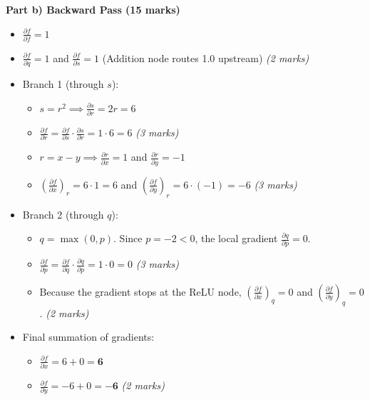 \documentclass[11pt]{article}
\begin{document}
\textbf{Part b) Backward Pass (15 marks)}
\begin{itemize}
    \item $\frac{\partial f}{\partial f} = 1$
    \item $\frac{\partial f}{\partial q} = 1$ and $\frac{\partial f}{\partial s} = 1$ (Addition node routes 1.0 upstream) \textit{(2 marks)}
    \item Branch 1 (through $s$):
        \begin{itemize}
            \item $s = r^2 \implies \frac{\partial s}{\partial r} = 2r = 6$
            \item $\frac{\partial f}{\partial r} = \frac{\partial f}{\partial s} \cdot \frac{\partial s}{\partial r} = 1 \cdot 6 = 6$ \textit{(3 marks)}
            \item $r = x - y \implies \frac{\partial r}{\partial x} = 1$ and $\frac{\partial r}{\partial y} = -1$
            \item $\left(\frac{\partial f}{\partial x}\right)_r = 6 \cdot 1 = 6$ and $\left(\frac{\partial f}{\partial y}\right)_r = 6 \cdot (-1) = -6$ \textit{(3 marks)}
        \end{itemize}
    \item Branch 2 (through $q$):
        \begin{itemize}
            \item $q = \max(0, p)$. Since $p = -2 < 0$, the local gradient $\frac{\partial q}{\partial p} = 0$.
            \item $\frac{\partial f}{\partial p} = \frac{\partial f}{\partial q} \cdot \frac{\partial q}{\partial p} = 1 \cdot 0 = 0$ \textit{(3 marks)}
            \item Because the gradient stops at the ReLU node, $\left(\frac{\partial f}{\partial x}\right)_q = 0$ and $\left(\frac{\partial f}{\partial y}\right)_q = 0$. \textit{(2 marks)}
        \end{itemize}
    \item Final summation of gradients:
        \begin{itemize}
            \item $\frac{\partial f}{\partial x} = 6 + 0 = \mathbf{6}$
            \item $\frac{\partial f}{\partial y} = -6 + 0 = \mathbf{-6}$ \textit{(2 marks)}
        \end{itemize}
\end{itemize}

\vspace{0.5cm}
\end{document}
